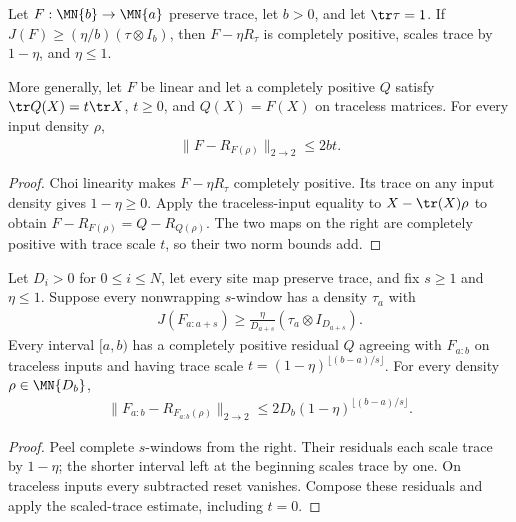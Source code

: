 \begin{theorem}
    \label{thm:rectangular_choi_residual}
    \leanok
    Let $F:\MN{b}\to\MN{a}$ preserve trace, let $b>0$, and let $\tr\tau=1$.
    If $J(F)\ge(\eta/b)(\tau\otimes I_b)$, then $F-\eta R_\tau$ is completely
    positive, scales trace by $1-\eta$, and $\eta\le1$.

    More generally, let $F$ be linear and let a completely positive $Q$ satisfy
    $\tr Q(X)=t\tr X$, $t\ge0$, and $Q(X)=F(X)$ on traceless matrices.
    For every input density $\rho$,
    \begin{align}
        \|F-R_{F(\rho)}\|_{2\to2}\le2bt.
    \end{align}
\end{theorem}
\begin{proof}\leanok
    Choi linearity makes $F-\eta R_\tau$ completely positive. Its trace on any
    input density gives $1-\eta\ge0$.
    Apply the traceless-input equality to $X-\tr(X)\rho$ to obtain
    $F-R_{F(\rho)}=Q-R_{Q(\rho)}$.
    The two maps on the right are completely positive with trace scale $t$,
    so their two norm bounds add.
\end{proof}

\begin{theorem}
    \label{thm:rectangular_window_estimate}
    \leanok
    Let $D_i>0$ for $0\le i\le N$, let every site map preserve trace, and fix
    $s\ge1$ and $\eta\le1$. Suppose every nonwrapping $s$-window has a density
    $\tau_a$ with
    \begin{align}
        J(F_{a:a+s})\ge\frac{\eta}{D_{a+s}}(\tau_a\otimes I_{D_{a+s}}).
    \end{align}
    Every interval $[a,b)$ has a completely positive residual $Q$ agreeing with
    $F_{a:b}$ on traceless inputs and having trace scale
    $t=(1-\eta)^{\lfloor(b-a)/s\rfloor}$. For every density $\rho\in\MN{D_b}$,
    \begin{align}
        \|F_{a:b}-R_{F_{a:b}(\rho)}\|_{2\to2}
        \le2D_b(1-\eta)^{\lfloor(b-a)/s\rfloor}.
    \end{align}
\end{theorem}
\begin{proof}\leanok
    Peel complete $s$-windows from the right. Their residuals each scale trace
    by $1-\eta$; the shorter interval left at the beginning scales trace by one.
    On traceless inputs every subtracted reset vanishes. Compose these residuals
    and apply the scaled-trace estimate, including $t=0$.
\end{proof}

